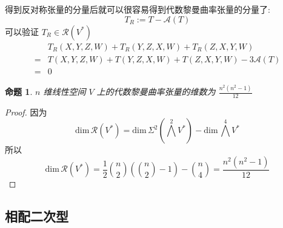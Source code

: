 \documentclass{book}
\newtheorem{proposition}[theorem]{\indent 命题}
\begin{document}
        得到反对称张量的分量后就可以很容易得到代数黎曼曲率张量的分量了:
        \begin{equation*}
            T_R := T - \mathcal{A}(T)
        \end{equation*}
        可以验证 $T_R\in\mathcal{R}(V^*)$
        \begin{align*}
            & T_R(X,Y,Z,W) + T_R(Y,Z,X,W) + T_R(Z,X,Y,W) \\
            =& T(X,Y,Z,W) + T(Y,Z,X,W) + T(Z,X,Y,W) - 3\mathcal{A}(T) \\
            =& 0
        \end{align*}

        \begin{proposition}
            $n$ 维线性空间 $V$ 上的代数黎曼曲率张量的维数为 $\displaystyle \frac{n^2(n^2-1)}{12}$
        \end{proposition}
        \begin{proof}
            因为
            \begin{equation*}
                \textstyle \mathrm{dim}\,\mathcal{R}(V^*) = \mathrm{dim}\,\Sigma^2(\bigwedge^2V^*) - \mathrm{dim}\,\bigwedge^4V^*
            \end{equation*}
            所以
            \begin{equation*}
                \mathrm{dim}\,\mathcal{R}(V^*) = \frac{1}{2}\binom{n}{2}\left(\binom{n}{2} - 1\right)-\binom{n}{4} = \frac{n^2(n^2-1)}{12}
            \end{equation*}
        \end{proof}
    
    \subsection{相配二次型}
    
\end{document}
